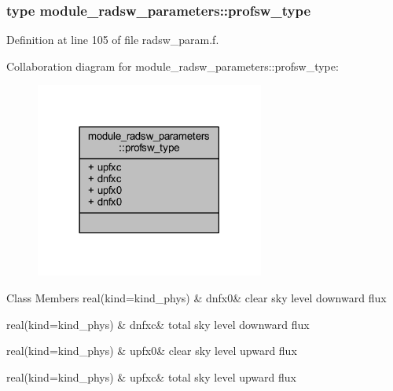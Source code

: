 \subsubsection{type module\+\_\+radsw\+\_\+parameters\+:\+:profsw\+\_\+type}


Definition at line 105 of file radsw\+\_\+param.\+f.



Collaboration diagram for module\+\_\+radsw\+\_\+parameters\+:\+:profsw\+\_\+type\+:\nopagebreak
\begin{figure}[H]
\begin{center}
\leavevmode
\includegraphics[width=213pt]{structmodule__radsw__parameters_1_1profsw__type__coll__graph}
\end{center}
\end{figure}
\begin{DoxyFields}{Class Members}
real(kind=kind\+\_\+phys)\hypertarget{group__module__radsw__main_gaff3ff3155ed05a18fa7caba351d1c503}{}\label{group__module__radsw__main_gaff3ff3155ed05a18fa7caba351d1c503}
&
dnfx0&
clear sky level downward flux \\
\hline

real(kind=kind\+\_\+phys)\hypertarget{group__module__radsw__main_ga4d253ac17ae97351a0a3eb15ab4d55e4}{}\label{group__module__radsw__main_ga4d253ac17ae97351a0a3eb15ab4d55e4}
&
dnfxc&
total sky level downward flux \\
\hline

real(kind=kind\+\_\+phys)\hypertarget{group__module__radsw__main_gaa9205ed3a95d61dd8e4e7184fd6da43e}{}\label{group__module__radsw__main_gaa9205ed3a95d61dd8e4e7184fd6da43e}
&
upfx0&
clear sky level upward flux \\
\hline

real(kind=kind\+\_\+phys)\hypertarget{group__module__radsw__main_ga5122ef2eef4e86a7aadf77114da4b3e2}{}\label{group__module__radsw__main_ga5122ef2eef4e86a7aadf77114da4b3e2}
&
upfxc&
total sky level upward flux \\
\hline

\end{DoxyFields}
\label{structmodule__radsw__parameters_1_1cmpfsw__type}
\hypertarget{group__module__radsw__main_structmodule__radsw__parameters_1_1cmpfsw__type}{}
